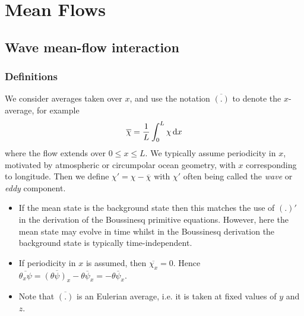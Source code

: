 \documentclass{jknotes}
\begin{document}
\begin{center}
\end{center}
		
\section{Mean Flows}
\subsection{Wave mean-flow interaction}
\subsubsection{Definitions}
We consider averages taken over $x$, and use the notation $\overline{(.)}$ to
denote the $x$-average, for example
\begin{equation}
	\overline{\chi} = \frac{1}{L} \int_0^L \chi \, \diffd x
\end{equation}
where the flow extends over $ 0 \le x \le L$. We typically assume periodicity
in $x$, motivated by atmospheric or circumpolar ocean geometry, with $x$
corresponding to longitude. Then we define $\chi' = \chi - \overline{\chi}$
with $\chi'$ often being called the \emph{wave} or \emph{eddy} component. 
\begin{itemize}
	\item If the mean state is the background state then this matches the use
		of $(.)'$ in the derivation of the Boussinesq primitive equations.
		However, here the mean state may evolve in time whilst in the
		Boussinesq derivation the background state is typically
		time-independent.

	\item If periodicity in $x$ is assumed, then $\overline{\chi_x} = 0$.
		Hence $\overline{\theta_x \psi} = \overline{(\theta \psi)_x} -
		\overline{\theta \psi_x} = -\overline{\theta \psi_x}$. 

	\item Note that $\overline{(.)}$ is an Eulerian average, i.e. it is taken
		at fixed values of $y$ and $z$.
\end{itemize}
\end{document}
